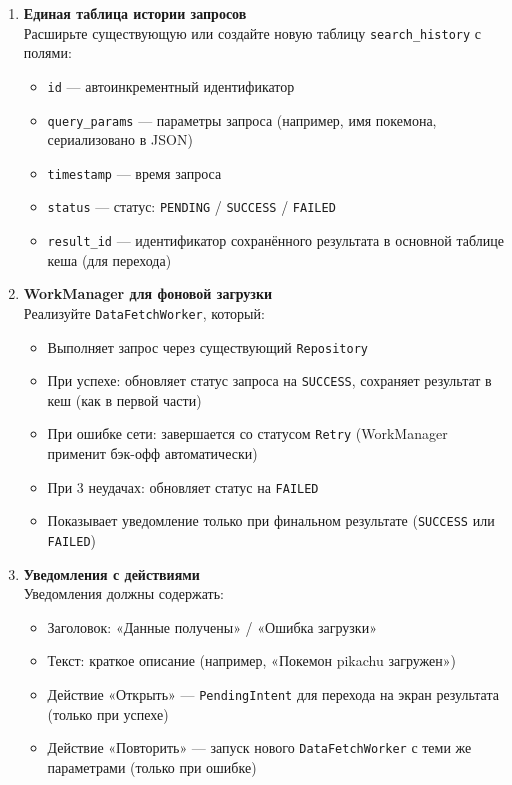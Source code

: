 \begin{enumerate}
    \item \textbf{Единая таблица истории запросов} \\
    Расширьте существующую или создайте новую таблицу \texttt{search\_history} с полями:
    \begin{itemize}
        \item \texttt{id} — автоинкрементный идентификатор
        \item \texttt{query\_params} — параметры запроса (например, имя покемона, сериализовано в JSON)
        \item \texttt{timestamp} — время запроса
        \item \texttt{status} — статус: \texttt{PENDING} / \texttt{SUCCESS} / \texttt{FAILED}
        \item \texttt{result\_id} — идентификатор сохранённого результата в основной таблице кеша (для перехода)
    \end{itemize}
    
    \item \textbf{WorkManager для фоновой загрузки} \\
    Реализуйте \texttt{DataFetchWorker}, который:
    \begin{itemize}
        \item Выполняет запрос через существующий \texttt{Repository}
        \item При успехе: обновляет статус запроса на \texttt{SUCCESS}, сохраняет результат в кеш (как в первой части)
        \item При ошибке сети: завершается со статусом \texttt{Retry} (WorkManager применит бэк-офф автоматически)
        \item При 3 неудачах: обновляет статус на \texttt{FAILED}
        \item Показывает уведомление только при финальном результате (\texttt{SUCCESS} или \texttt{FAILED})
    \end{itemize}
    
    \item \textbf{Уведомления с действиями} \\
    Уведомления должны содержать:
    \begin{itemize}
        \item Заголовок: «Данные получены» / «Ошибка загрузки»
        \item Текст: краткое описание (например, «Покемон pikachu загружен»)
        \item Действие «Открыть» — \texttt{PendingIntent} для перехода на экран результата 
        (только при успехе)
        \item Действие «Повторить» — запуск нового \texttt{DataFetchWorker} с теми же параметрами 
        (только при ошибке)
    \end{itemize}
\end{enumerate}